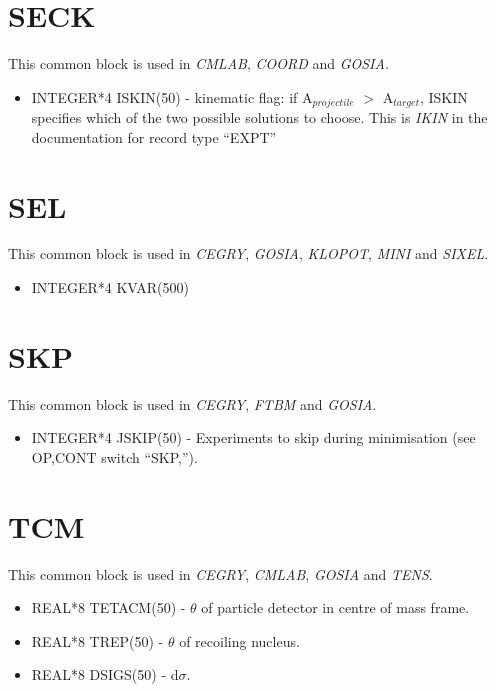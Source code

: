 \section{SECK}

This common block is used in {\em CMLAB}, {\em COORD} and {\em GOSIA}.

\begin{itemize}
\item INTEGER*4 ISKIN(50) - kinematic flag: if A$_{projectile}$ $>$
A$_{target}$, ISKIN specifies which of the two possible solutions to choose.
This is {\em IKIN} in the documentation for record type ``EXPT''
\end{itemize}

\section{SEL}

This common block is used in {\em CEGRY}, {\em GOSIA}, {\em KLOPOT}, {\em
MINI} and {\em SIXEL}.

\begin{itemize}
\item INTEGER*4 KVAR(500)
\end{itemize}

\section{SKP}

This common block is used in {\em CEGRY}, {\em FTBM} and {\em GOSIA}.

\begin{itemize}
\item INTEGER*4 JSKIP(50) - Experiments to skip during minimisation (see
OP,CONT switch ``SKP,'').
\end{itemize}

\section{TCM}

This common block is used in {\em CEGRY}, {\em CMLAB}, {\em GOSIA} and {\em
TENS}.

\begin{itemize}
\item REAL*8 TETACM(50) - $\theta$ of particle detector in centre of mass
frame.
\item REAL*8 TREP(50) - $\theta$ of recoiling nucleus.
\item REAL*8 DSIGS(50) - d$\sigma$.
\end{itemize}

